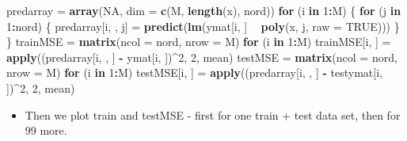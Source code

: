 \documentclass[]{article}
\newenvironment{Shaded}{\begin{snugshade}}{\end{snugshade}}
\newcommand{\KeywordTok}[1]{\textcolor[rgb]{0.13,0.29,0.53}{\textbf{#1}}}
\newcommand{\DataTypeTok}[1]{\textcolor[rgb]{0.13,0.29,0.53}{#1}}
\newcommand{\DecValTok}[1]{\textcolor[rgb]{0.00,0.00,0.81}{#1}}
\newcommand{\StringTok}[1]{\textcolor[rgb]{0.31,0.60,0.02}{#1}}
\newcommand{\OtherTok}[1]{\textcolor[rgb]{0.56,0.35,0.01}{#1}}
\newcommand{\ControlFlowTok}[1]{\textcolor[rgb]{0.13,0.29,0.53}{\textbf{#1}}}
\newcommand{\OperatorTok}[1]{\textcolor[rgb]{0.81,0.36,0.00}{\textbf{#1}}}
\newcommand{\NormalTok}[1]{#1}
\providecommand{\tightlist}{%
  \setlength{\itemsep}{0pt}\setlength{\parskip}{0pt}}
\begin{document}
\begin{Shaded}
\begin{Highlighting}[]
\NormalTok{predarray =}\StringTok{ }\KeywordTok{array}\NormalTok{(}\OtherTok{NA}\NormalTok{, }\DataTypeTok{dim =} \KeywordTok{c}\NormalTok{(M, }\KeywordTok{length}\NormalTok{(x), nord))}
\ControlFlowTok{for}\NormalTok{ (i }\ControlFlowTok{in} \DecValTok{1}\OperatorTok{:}\NormalTok{M) \{}
    \ControlFlowTok{for}\NormalTok{ (j }\ControlFlowTok{in} \DecValTok{1}\OperatorTok{:}\NormalTok{nord) \{}
\NormalTok{        predarray[i, , j] =}\StringTok{ }\KeywordTok{predict}\NormalTok{(}\KeywordTok{lm}\NormalTok{(ymat[i, ] }\OperatorTok{~}\StringTok{ }\KeywordTok{poly}\NormalTok{(x, j, }\DataTypeTok{raw =} \OtherTok{TRUE}\NormalTok{)))}
\NormalTok{    \}}
\NormalTok{\}}
\NormalTok{trainMSE =}\StringTok{ }\KeywordTok{matrix}\NormalTok{(}\DataTypeTok{ncol =}\NormalTok{ nord, }\DataTypeTok{nrow =}\NormalTok{ M)}
\ControlFlowTok{for}\NormalTok{ (i }\ControlFlowTok{in} \DecValTok{1}\OperatorTok{:}\NormalTok{M) trainMSE[i, ] =}\StringTok{ }\KeywordTok{apply}\NormalTok{((predarray[i, , ] }\OperatorTok{-}\StringTok{ }\NormalTok{ymat[i, ])}\OperatorTok{^}\DecValTok{2}\NormalTok{, }
    \DecValTok{2}\NormalTok{, mean)}
\NormalTok{testMSE =}\StringTok{ }\KeywordTok{matrix}\NormalTok{(}\DataTypeTok{ncol =}\NormalTok{ nord, }\DataTypeTok{nrow =}\NormalTok{ M)}
\ControlFlowTok{for}\NormalTok{ (i }\ControlFlowTok{in} \DecValTok{1}\OperatorTok{:}\NormalTok{M) testMSE[i, ] =}\StringTok{ }\KeywordTok{apply}\NormalTok{((predarray[i, , ] }\OperatorTok{-}\StringTok{ }\NormalTok{testymat[i, ])}\OperatorTok{^}\DecValTok{2}\NormalTok{, }
    \DecValTok{2}\NormalTok{, mean)}
\end{Highlighting}
\end{Shaded}

\begin{itemize}
\tightlist
\item
  Then we plot train and testMSE - first for one train + test data set,
  then for 99 more.
\end{itemize}
\end{document}
